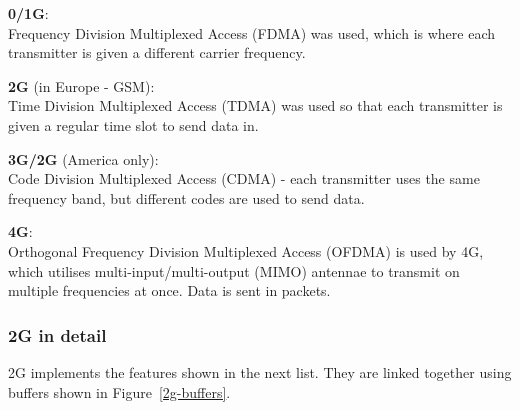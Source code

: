 
\begin{description}
  \item \textbf{0/1G}:\\
    Frequency Division Multiplexed Access (FDMA) was used, which is where
    each transmitter is given a different carrier frequency.
  \item \textbf{2G} (in Europe - GSM):\\
    Time Division Multiplexed Access (TDMA) was used so that each transmitter
    is given a regular time slot to send data in.
  \item \textbf{3G/2G} (America only):\\
    Code Division Multiplexed Access (CDMA) - each transmitter uses the same
    frequency band, but different codes are used to send data.
  \item \textbf{4G}:\\
    Orthogonal Frequency Division Multiplexed Access (OFDMA) is used by 4G,
    which utilises multi-input/multi-output (MIMO) antennae to transmit on
    multiple frequencies at once. Data is sent in packets.
\end{description}

\subsubsection{2G in detail}

2G implements the features shown in the next list. They are linked together
using buffers shown in Figure~\ref{2g-buffers}.

